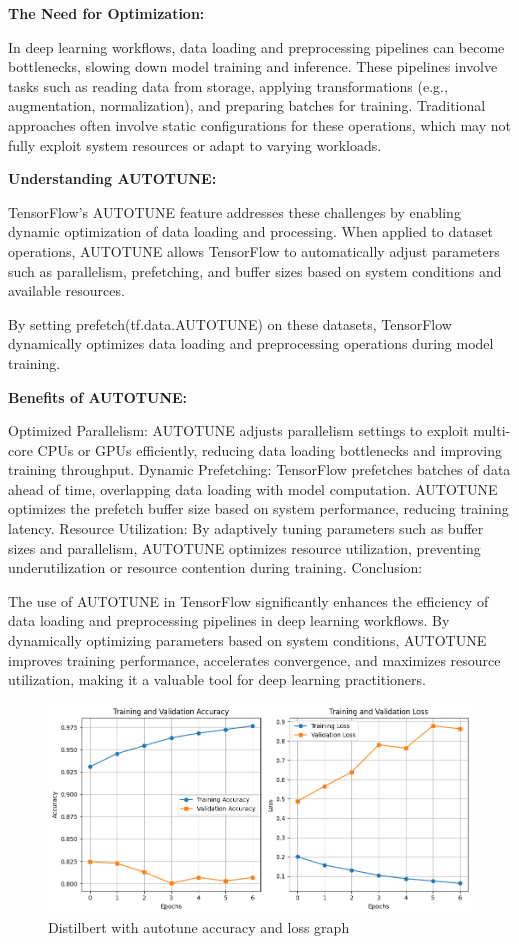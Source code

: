 \textbf{The Need for Optimization:}

In deep learning workflows, data loading and preprocessing pipelines can become bottlenecks, slowing down model training and inference. These pipelines involve tasks such as reading data from storage, applying transformations (e.g., augmentation, normalization), and preparing batches for training. Traditional approaches often involve static configurations for these operations, which may not fully exploit system resources or adapt to varying workloads.

\textbf{Understanding AUTOTUNE:}

TensorFlow's AUTOTUNE feature addresses these challenges by enabling dynamic optimization of data loading and processing. When applied to dataset operations, AUTOTUNE allows TensorFlow to automatically adjust parameters such as parallelism, prefetching, and buffer sizes based on system conditions and available resources.

By setting prefetch(tf.data.AUTOTUNE) on these datasets, TensorFlow dynamically optimizes data loading and preprocessing operations during model training.

\textbf{Benefits of AUTOTUNE:}

Optimized Parallelism: AUTOTUNE adjusts parallelism settings to exploit multi-core CPUs or GPUs efficiently, reducing data loading bottlenecks and improving training throughput.
Dynamic Prefetching: TensorFlow prefetches batches of data ahead of time, overlapping data loading with model computation. AUTOTUNE optimizes the prefetch buffer size based on system performance, reducing training latency.
Resource Utilization: By adaptively tuning parameters such as buffer sizes and parallelism, AUTOTUNE optimizes resource utilization, preventing underutilization or resource contention during training.
Conclusion:

The use of AUTOTUNE in TensorFlow significantly enhances the efficiency of data loading and preprocessing pipelines in deep learning workflows. By dynamically optimizing parameters based on system conditions, AUTOTUNE improves training performance, accelerates convergence, and maximizes resource utilization, making it a valuable tool for deep learning practitioners.

\begin{figure}[ht]
    \centering
    \includegraphics[scale=0.7]{figures/autotune_trainingValidation.png}
    \caption{Distilbert with autotune accuracy and loss graph}
\end{figure}

